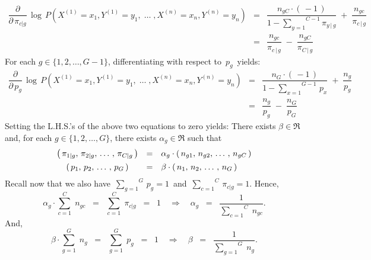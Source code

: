 \begin{eqnarray*}
\dfrac{\partial}{\partial\,\pi_{c \vert g}}\,
\log\,P\!\left(X^{(1)} = x_{1},Y^{(1)}=y_{1}, \;\ldots\; ,X^{(n)} = x_{n},Y^{(n)}=y_{n}\right)
&=&
	\dfrac{n_{gC}\cdot(\,-1\,)}{1 - \overset{C-1}{\underset{y=1}{\sum}}\pi_{y\,\vert\,g}}
	\; + \;
	\dfrac{n_{gc}}{\pi_{c\,\vert\,g}}
\\
&=&
	\dfrac{n_{gc}}{\pi_{c\,\vert\,g}}
	\; - \;
	\dfrac{n_{gC}}{\pi_{C\,\vert\,g}}
\end{eqnarray*}
For each $g \in \{1,2,\ldots,G-1\}$, differentiating with respect to \,$p_{g}$\, yields:
\begin{eqnarray*}
\dfrac{\partial}{\partial\,p_{g}}\,
\log\,P\!\left(X^{(1)} = x_{1},Y^{(1)}=y_{1}, \;\ldots\; ,X^{(n)} = x_{n},Y^{(n)}=y_{n}\right)
&=&
	\dfrac{n_{G}\cdot(\,-1\,)}{1 - \overset{G-1}{\underset{x=1}{\sum}}\,p_{x}}
	\; + \;
	\dfrac{n_{g}}{p_{g}}
\\
&=&
	\dfrac{n_{g}}{p_{g}}
	\; - \;
	\dfrac{n_{G}}{p_{G}}
\end{eqnarray*}
Setting the L.H.S.'s of the above two equations to zero yields:
There exists $\beta \in \Re$ and, 
for each $g \in \{1,2,\ldots,G\}$, there exists $\alpha_{g} \in \Re$ such that
\begin{equation*}
	\begin{array}{ccl}
	\left(\,\pi_{1\vert g},\,\pi_{2\vert g}, \,\ldots\,, \,\pi_{C\vert g}\,\right)
	& = & \alpha_{g} \cdot \left(\,n_{g1},\,n_{g2}, \,\ldots\,,\, n_{gC}\,\right)
	\\
	\left(\,p_{1},\,p_{2}, \,\ldots\,, \,p_{G}\,\right)
	& \overset{{\color{white}\vert}}{=} & \beta \cdot \left(\,n_{1},\,n_{2}, \,\ldots\,,\, n_{G}\,\right)
	\end{array}
\end{equation*}
Recall now that we also have
\,$\overset{G}{\underset{g=1}{\sum}}\,p_{g} = 1$\, and
\,$\overset{C}{\underset{c=1}{\sum}}\,\pi_{c\vert g} = 1$.
Hence,
\begin{equation*}
\alpha_{g} \cdot \overset{C}{\underset{c=1}{\sum}}\;n_{gc}
\;\; = \;\; \overset{C}{\underset{c=1}{\sum}}\;\pi_{c\vert g}
\;\; = \;\; 1
\quad\Longrightarrow\quad
\alpha_{g} \;\;=\;\; \dfrac{1}{\overset{C}{\underset{c=1}{\sum}}\;n_{gc}}.
\end{equation*}
And,
\begin{equation*}
\beta \cdot \overset{G}{\underset{g=1}{\sum}}\;n_{g}
\;\; = \;\; \overset{G}{\underset{g=1}{\sum}}\;p_{g}
\;\; = \;\; 1
\quad\Longrightarrow\quad
\beta \;\;=\;\; \dfrac{1}{\overset{G}{\underset{g=1}{\sum}}\;n_{g}}.
\end{equation*}
